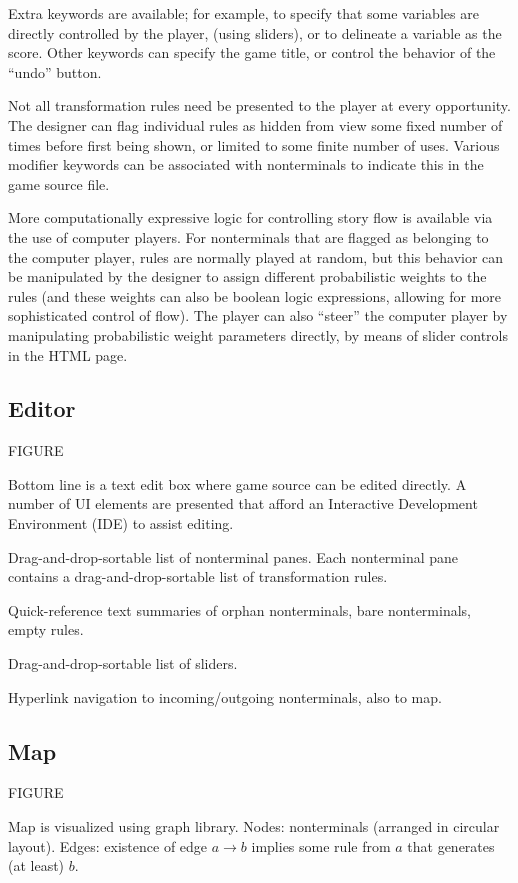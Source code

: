 \documentclass{acm_proc_article-sp}
\begin{document}
Extra keywords are available; for example, to specify that some variables are directly controlled by the player,
(using sliders), or to delineate a variable as the score.
Other keywords can specify the game title, or control the behavior of the ``undo'' button.

Not all transformation rules need be presented to the player at every opportunity.
The designer can flag individual rules as hidden from view some fixed number of times
before first being shown, or limited to some finite number of uses.
Various modifier keywords can be associated with nonterminals to indicate this in the game source file.

More computationally expressive logic for controlling story flow is available via the use of computer players.
For nonterminals that are flagged as belonging to the computer player,
rules are normally played at random,
but this behavior can be manipulated by the designer to
assign different probabilistic weights to the rules
(and these weights can also be boolean logic expressions, allowing for more sophisticated control of flow).
The player can also ``steer'' the computer player by manipulating probabilistic weight parameters directly,
by means of slider controls in the HTML page.

\subsection{Editor}

FIGURE

Bottom line is a text edit box where game source can be edited directly.
A number of UI elements are presented that afford an Interactive Development Environment (IDE) to assist editing.

Drag-and-drop-sortable list of nonterminal panes.
Each nonterminal pane contains a drag-and-drop-sortable list of transformation rules.

Quick-reference text summaries of orphan nonterminals, bare nonterminals, empty rules.

Drag-and-drop-sortable list of sliders.

Hyperlink navigation to incoming/outgoing nonterminals, also to map.

\subsection{Map}

FIGURE

Map is visualized using graph library.
Nodes: nonterminals (arranged in circular layout).
Edges: existence of edge $a \to b$ implies some rule from $a$ that generates (at least) $b$.
\end{document}
